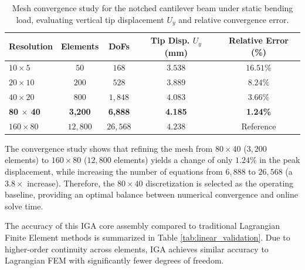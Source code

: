 \begin{table}[htbp]
    \centering
    \caption{Mesh convergence study for the notched cantilever beam under static bending load, evaluating vertical tip displacement $U_y$ and relative convergence error.}
    \label{tab:mesh_convergence}
    \begin{tabular}{lcccc}
        \toprule
        \textbf{Resolution}     & \textbf{Elements} & \textbf{DoFs}  & \textbf{Tip Disp. $U_y$ (mm)} & \textbf{Relative Error (\%)} \\
        \midrule
        $10 \times 5$           & $50$              & $168$          & $3.538$                       & $16.51\%$                    \\
        $20 \times 10$          & $200$             & $528$          & $3.889$                       & $8.24\%$                     \\
        $40 \times 20$          & $800$             & $1,848$        & $4.083$                       & $3.66\%$                     \\
        \textbf{80 $\times$ 40} & \textbf{3,200}    & \textbf{6,888} & \textbf{4.185}                & \textbf{1.24\%}              \\
        $160 \times 80$         & $12,800$          & $26,568$       & $4.238$                       & Reference                    \\
        \bottomrule
    \end{tabular}
\end{table}

The convergence study shows that refining the mesh from $80 \times 40$ ($3,200$ elements) to $160 \times 80$ ($12,800$ elements) yields a change of only $1.24\%$ in the peak displacement, while increasing the number of equations from $6,888$ to $26,568$ (a $3.8\times$ increase). Therefore, the $80 \times 40$ discretization is selected as the operating baseline, providing an optimal balance between numerical convergence and online solve time.

The accuracy of this IGA core assembly compared to traditional Lagrangian Finite Element methods is summarized in Table \ref{tab:linear_validation}. Due to higher-order continuity across elements, IGA achieves similar accuracy to Lagrangian FEM with significantly fewer degrees of freedom.



